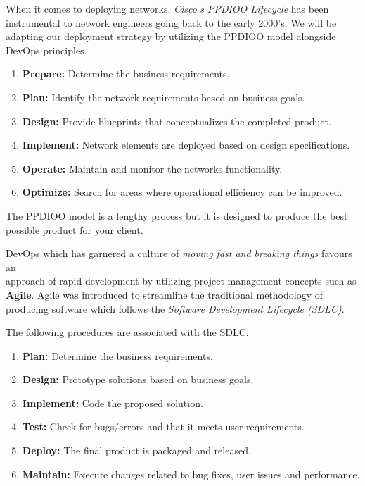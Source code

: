 \documentclass[12pt, letterpaper]{article}
\begin{document}
When it comes to deploying networks, \textit{Cisco's PPDIOO Lifecycle} has been instrumental to network engineers going back to the early 2000's. We will be adapting our deployment strategy by utilizing the PPDIOO model alongside DevOps principles.

\smallskip

\begin{enumerate}
\item \textbf{Prepare:} Determine the business requirements.
\item \textbf{Plan:} Identify the network requirements based on business goals.
\item \textbf{Design:} Provide blueprints that conceptualizes the completed product.
\item \textbf{Implement:} Network elements are deployed based on design specifications.
\item \textbf{Operate:} Maintain and monitor the networks functionality.
\item \textbf{Optimize:} Search for areas where operational efficiency can be improved.
\end{enumerate}

\smallskip

The PPDIOO model is a lengthy process but it is designed to produce the best possible product for your client.

\smallskip

DevOps which has garnered a culture of \textit{moving fast and breaking things} favours an \\ approach of rapid development by utilizing project management concepts such as \\ \textbf{Agile}. Agile was introduced to streamline the traditional methodology of producing software which follows the \textit{Software Development Lifecycle (SDLC)}.

The following procedures are associated with the SDLC.

\begin{enumerate}
\item \textbf{Plan:} Determine the business requirements.
\item \textbf{Design:} Prototype solutions based on business goals.
\item \textbf{Implement:} Code the proposed solution.
\item \textbf{Test:} Check for bugs/errors and that it meets user requirements.
\item \textbf{Deploy:} The final product is packaged and released.
\item \textbf{Maintain:} Execute changes related to bug fixes, user issues and performance.
\end{enumerate}
\end{document}

